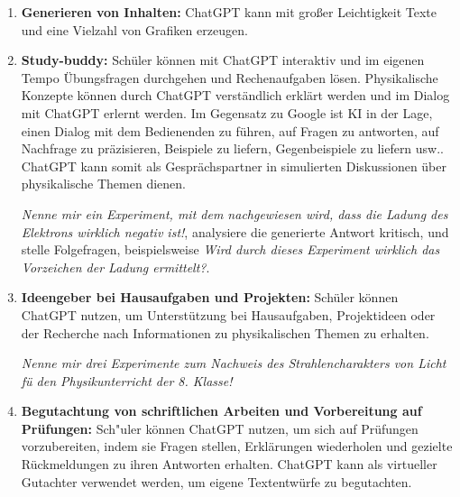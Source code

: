 \begin{enumerate}
\item \textbf{Generieren von Inhalten:} ChatGPT kann mit gro{\ss}er Leichtigkeit Texte und eine Vielzahl von Grafiken erzeugen. 
	\begin{beisp} 
	\end{beisp}

\item \textbf{Study-buddy:} Sch\"{u}ler k\"{o}nnen  mit ChatGPT interaktiv und im eigenen Tempo \"{U}bungsfragen durchgehen und Rechenaufgaben l\"{o}sen. Physikalische Konzepte k\"{o}nnen durch ChatGPT verst\"{a}ndlich erkl\"{a}rt werden und im Dialog mit ChatGPT erlernt werden. Im Gegensatz zu Google ist KI in der Lage, einen Dialog mit dem Bedienenden zu f\"{u}hren, auf Fragen zu antworten, auf Nachfrage zu pr\"{a}zisieren, Beispiele zu liefern, Gegenbeispiele zu liefern usw.. ChatGPT kann somit als Gespr\"{a}chspartner in simulierten Diskussionen \"{u}ber physikalische Themen dienen. 
	\begin{beisp}
	\glqq\emph{Nenne mir ein Experiment, mit dem nachgewiesen wird, dass die Ladung des Elektrons wirklich negativ ist!}\grqq,  analysiere die generierte Antwort kritisch, und stelle Folgefragen, beispielsweise \glqq\emph{Wird durch dieses Experiment wirklich das Vorzeichen der Ladung ermittelt?}\grqq.  
	\end{beisp}

\item \textbf{Ideengeber bei Hausaufgaben und Projekten:} Sch\"{u}ler k\"{o}nnen ChatGPT nutzen, um Unterst\"{u}tzung bei Hausaufgaben, Projektideen oder der Recherche nach Informationen zu physikalischen Themen zu erhalten. 
	\begin{beisp} 
	\glqq\emph{Nenne mir drei Experimente zum Nachweis des Strahlencharakters von Licht f\"{u} den Physikunterricht der 8. Klasse!}\grqq
	\end{beisp}

\item \textbf{Begutachtung von schriftlichen Arbeiten und Vorbereitung auf Pr\"{u}fungen:} Sch"{u}ler k\"{o}nnen ChatGPT nutzen, um sich auf Pr\"{u}fungen vorzubereiten, indem sie Fragen stellen, Erkl\"{a}rungen wiederholen und gezielte R\"{u}ckmeldungen zu ihren Antworten erhalten. ChatGPT kann als virtueller Gutachter verwendet werden, um eigene Textentw\"{u}rfe zu begutachten. 


\end{enumerate}
